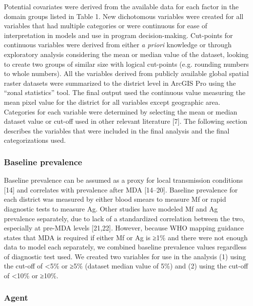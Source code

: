 \documentclass[11pt,a4paper]{article}
\begin{document}
Potential covariates were derived from the available data for each factor in the domain groups listed in Table 1. New dichotomous variables were created for all variables that had multiple categories or were continuous for ease of interpretation in models and use in program decision-making. Cut-points for continuous variables were derived from either \textit{a priori} knowledge or through exploratory analysis considering the mean or median value of the dataset, looking to create two groups of similar size with logical cut-points (e.g. rounding numbers to whole numbers). All the variables derived from publicly available global spatial raster datasets were summarized to the district level in ArcGIS Pro using the “zonal statistics” tool. The final output used the continuous value measuring the mean pixel value for the district for all variables except geographic area. Categories for each variable were determined by selecting the mean or median dataset value or cut-off used in other relevant literature [7]. The following section describes the variables that were included in the final analysis and the final categorizations used.

\subsubsection{Baseline prevalence}

Baseline prevalence can be assumed as a proxy for local transmission conditions [14] and correlates with prevalence after MDA [14–20]. Baseline prevalence for each district was measured by either blood smears to measure Mf or rapid diagnostic tests to measure Ag. Other studies have modeled Mf and Ag prevalence separately, due to lack of a standardized correlation between the two, especially at pre-MDA levels [21,22]. However, because WHO mapping guidance states that MDA is required if either Mf or Ag is ≥1\% and there were not enough data to model each separately, we combined baseline prevalence values regardless of diagnostic test used. We created two variables for use in the analysis (1) using the cut-off of <5\% or ≥5\% (dataset median value of 5\%) and (2) using the cut-off of <10\% or ≥10\%.

\subsubsection{Agent}
\end{document}
